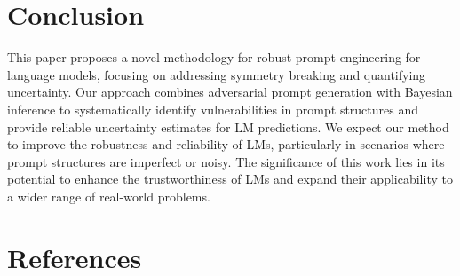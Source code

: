 \documentclass{article}
\begin{document}
\section{Conclusion}
This paper proposes a novel methodology for robust prompt engineering for language models, focusing on addressing symmetry breaking and quantifying uncertainty. Our approach combines adversarial prompt generation with Bayesian inference to systematically identify vulnerabilities in prompt structures and provide reliable uncertainty estimates for LM predictions. We expect our method to improve the robustness and reliability of LMs, particularly in scenarios where prompt structures are imperfect or noisy. The significance of this work lies in its potential to enhance the trustworthiness of LMs and expand their applicability to a wider range of real-world problems.

\section*{References}
\end{document}
